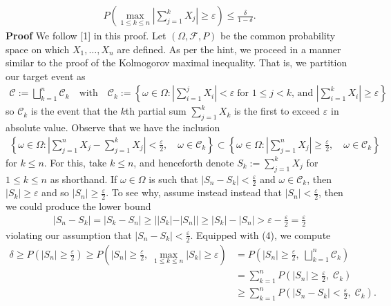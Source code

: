 \documentclass[10pt]{article}
\newcommand{\bp}[1]{\left({#1}\right)}
\newcommand{\1}[1]{\mathbbm{1}_{#1}}
\newcommand{\mc}[1]{\mathcal{#1}}
\begin{document}
    \begin{align*}
        P\bp{\max_{1\leq k\leq n}\left|\sum_{j=1}^kX_j\right|\geq \varepsilon}\leq \frac{\delta}{1-\delta}.
    \end{align*}
    {\bf Proof}\hspace{5pt} We follow [1] in this proof. Let $(\Omega,\mc{F},P)$ be the common probability space on which $X_1,\dots, X_n$ are defined. As per the hint, we proceed in a manner similar to the proof of the Kolmogorov maximal inequality. That is, we partition our target event as
    \begin{align*}
        \mc{C}:=\bigsqcup_{k=1}^n\mc{C}_k\quad\text{with}\quad \mc{C}_k:=\left\{\omega\in\Omega:\left|\sum_{i=1}^jX_i\right|<\varepsilon\;\text{for $1\leq j<k$, and }\left|\sum_{i=1}^kX_i\right|\geq\varepsilon\right\}
    \end{align*}
    so $\mc{C}_k$ is the event that the $k$th partial sum $\sum_{j=1}^kX_k$ is the first to exceed $\varepsilon$ in absolute value. Observe that we have the inclusion
    \begin{align*}
        \left\{\omega\in\Omega:\left|\sum_{j=1}^{n}X_j-\sum_{j=1}^kX_j\right|<\frac{\varepsilon}{2},\quad\omega\in\mc{C}_k\right\}\subset\left\{\omega\in\Omega:\left|\sum_{j=1}^nX_j\right|\geq\frac{\varepsilon}{2},\quad\omega\in\mc{C}_k\right\}\tag{4}
    \end{align*}
    for $k\leq n$. For this, take $k\leq n$, and henceforth denote $S_k:=\sum_{j=1}^kX_j$ for $1\leq k\leq n$ as shorthand. If $\omega\in\Omega$ is such that $|S_n-S_k|<\tfrac{\varepsilon}{2}$ and $\omega\in\mc{C}_k$, then $|S_k|\geq\varepsilon$ and so $|S_n|\geq\tfrac{\varepsilon}{2}$. To see why, assume instead instead that $|S_n|<\tfrac{\varepsilon}{2}$, then we could produce the lower bound
    \begin{align*}
        \left|S_n-S_k\right|=\left|S_k-S_n\right|\geq ||S_k|-|S_n||\geq |S_k|-|S_n|>\varepsilon-\frac{\varepsilon}{2}=\frac{\varepsilon}{2}
    \end{align*}
    violating our assumption that $|S_n-S_k|<\tfrac{\varepsilon}{2}$. Equipped with (4), we compute
    \begin{align*}
        \delta\geq P\bp{\left|S_n\right|\geq\frac{\varepsilon}{2}}\geq P\bp{\left|S_n\right|\geq\frac{\varepsilon}{2},\;\max_{1\leq k\leq n}\left|S_k\right|\geq\varepsilon}&=P\bp{\left|S_n\right|\geq\frac{\varepsilon}{2},\;\bigsqcup_{k=1}^n\mc{C}_k}\\
        &=\sum_{k=1}^nP\bp{\left|S_n\right|\geq\frac{\varepsilon}{2},\; \mc{C}_k}\\
        &\geq \sum_{k=1}^nP\bp{|S_{n}-S_k|<\frac{\varepsilon}{2},\;\mc{C}_k}.\tag{by (4)}
    \end{align*}
\end{document}
